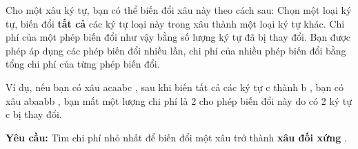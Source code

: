 Cho một xâu ký tự, bạn có thể biến đổi xâu này theo cách sau: Chọn một loại ký tự, biến đổi \textbf{ tất cả } các ký tự loại này trong xâu thành một loại ký tự khác. Chi phí của một phép biến đổi như vậy bằng số lượng ký tự đã bị thay đổi. Bạn được phép áp dụng các phép biến đổi nhiều lần, chi phí của nhiều phép biến đổi bằng tổng chi phí của từng phép biến đổi.

Ví dụ, nếu bạn có xâu acaabc , sau khi biến tất cả các ký tự c thành b , bạn có xâu abaabb , bạn mất một lượng chi phí là 2 cho phép biến đổi này do có 2 ký tự c bị thay đổi.

\textbf{Yêu cầu: } Tìm chi phí nhỏ nhất để biến đổi một xâu trở thành \textbf{ xâu đối xứng } .